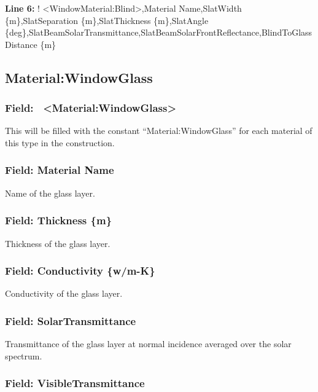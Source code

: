 \textbf{Line 6:} ! \textless{}WindowMaterial:Blind\textgreater{},Material Name,SlatWidth \{m\},SlatSeparation \{m\},SlatThickness \{m\},SlatAngle \{deg\},SlatBeamSolarTransmittance,SlatBeamSolarFrontReflectance,BlindToGlassDistance \{m\}

\subsection{Material\textbf{:}WindowGlass}\label{materialwindowglass}

\subsubsection{Field:~ \textless{}Material:WindowGlass\textgreater{}}\label{field-materialwindowglass}

This will be filled with the constant ``Material:WindowGlass'' for each material of this type in the construction.

\subsubsection{Field: Material Name}\label{field-material-name-2}

Name of the glass layer.

\subsubsection{Field: Thickness \{m\}}\label{field-thickness-m}

Thickness of the glass layer.

\subsubsection{Field: Conductivity \{w/m-K\}}\label{field-conductivity-wm-k}

Conductivity of the glass layer.

\subsubsection{Field: SolarTransmittance}\label{field-solartransmittance}

Transmittance of the glass layer at normal incidence averaged over the solar spectrum.

\subsubsection{Field: VisibleTransmittance}\label{field-visibletransmittance}

